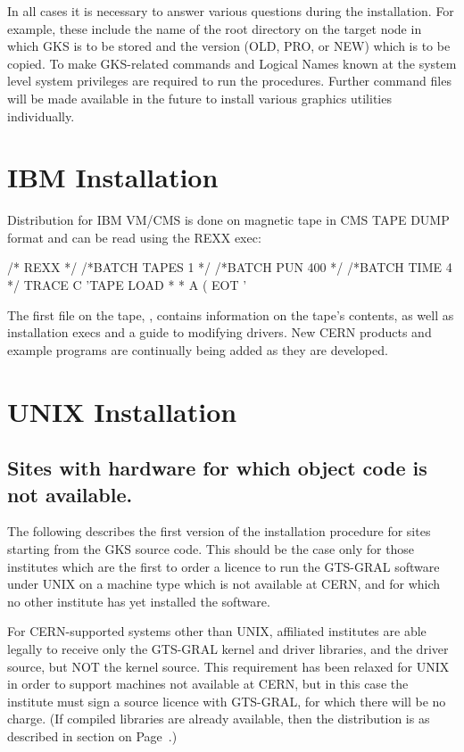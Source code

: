 In all cases it is necessary to answer various questions during the
installation. For example, these include the name of the root directory
on the target node in which GKS is to be stored and the version (OLD, PRO,
or NEW) which is to be copied. To make GKS-related commands and Logical
Names known at the system level system privileges are required to run
the procedures. Further command files will be made available in the future
to install various graphics utilities individually.
\section{IBM Installation}
Distribution for IBM VM/CMS is done on magnetic tape in CMS TAPE DUMP
format and can be read using the REXX exec:
\begin{XMP}
 /* REXX */
 /*BATCH TAPES 1 */
 /*BATCH PUN 400 */
 /*BATCH TIME 4  */
 TRACE C
 'TAPE LOAD * * A ( EOT  '
\end{XMP}
The first file on the tape, , contains information on
the tape's contents, as well as installation execs and a guide to modifying
drivers. New CERN products and example programs are continually being added
as they are developed.
\section{\protect\label{sec:unixdis}UNIX Installation}
\subsection{\protect\label{sec:unixdna}Sites with hardware for which object code is not available.}
 
The following describes the first version of the installation procedure
for sites starting from the GKS source code.
This should be the case only for
those institutes which are the first to order a licence to run
the GTS-GRAL software under UNIX on a machine type which is not
available at CERN, and for which no other institute has yet installed
the software.
 
For CERN-supported systems other than UNIX, affiliated institutes
are able legally to receive only the GTS-GRAL kernel and driver libraries,
and the driver source, but NOT the kernel source.
This requirement has been relaxed for UNIX in order to support machines
not available at CERN, but in this case the institute must sign a source
licence with GTS-GRAL, for which there will be no charge.
(If compiled libraries are already available,
then the distribution is as described in section on Page~\pageref{sec:objcode}.)
 
